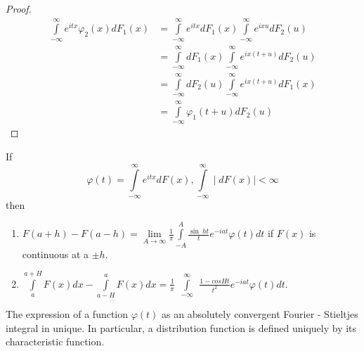 \begin{proof}
  \begin{align*}
  \int\limits^\infty_{-\infty}e^{itx}  \varphi_2(x)  dF_1(x)  &=
  \int\limits^\infty_{-\infty}e^{itx} dF_1(x)
  \int\limits^\infty_{-\infty}e^{ixu}   
  dF_2(u)\\
  & = \int\limits^\infty_{-\infty} dF_1(x)
  \int\limits^\infty_{-\infty}e^{ix(t+u)} dF_2(u) \\ 
  & = {\int\limits^\infty_{-\infty} dF_2(u)
    \int\limits^\infty_{-\infty}e^{ix(t+u)} dF_1(x)} \\ 
  &= {\int\limits^\infty_{-\infty} \varphi_1(t+u) dF_2(u)}
  \end{align*}
\end{proof}

\begin{theorem}\label{chap2:sec5:thm14} %
  If 
  $$ 
  \varphi(t)=\int\limits^\infty_{-\infty}e^{itx} dF(x),
  \int\limits^\infty_{-\infty}\mid dF(x)\mid < \infty
  $$ 
  then
  \begin{enumerate}[\rm (i)]
  \item $F(a+h)-F(a-h) = \lim\limits_{A \rightarrow
    \infty}\frac{1}{\pi}\int\limits^A_{-A} \frac{\sin~ht}{t}e^{-iat} \varphi(t)
    dt$ if $F(x)$ is continuous at a $\pm  h$.     
    
  \item $\int\limits^{a + H}_{a} F(x)dx - \int\limits^{a}_{a-H} F(x)dx =
    \frac{1}{\pi}~~ \int\limits^{\infty}_{-\infty} ~~ \frac {1-cos
      Ht}{t^2}e^{-iat} \varphi (t)dt$.  
  \end{enumerate}
\end{theorem}\pageoriginale

\begin{coro*}
  The expression of a function $\varphi (t)$ as an 
  absolutely convergent Fourier - Stieltjes integral in unique. In 
  particular, a distribution function is defined uniquely by its
  characteristic function. 
\end{coro*}

